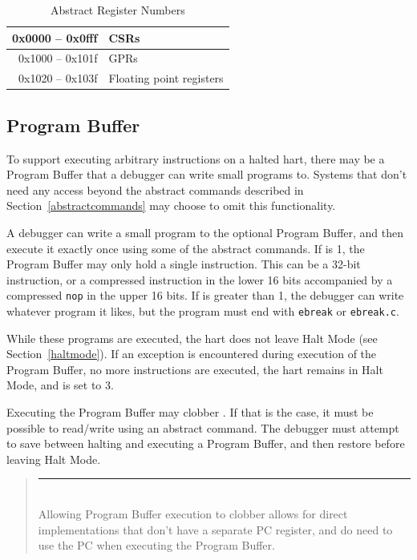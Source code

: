 \documentclass{article}
\newenvironment{commentary}
{
   \begin{quotation}
   \noindent
   \small \em
   \rule{\linewidth}{1pt}\\
}
{
   \end{quotation}
}
\begin{document}
\begin{table}[htp]
    \centering
    \caption{Abstract Register Numbers}
    \label{tab:regno}
    \begin{tabulary}{\textwidth}{|r|l|}
        \hline
        0x0000 -- 0x0fff & CSRs \\
        \hline
        0x1000 -- 0x101f & GPRs \\
        \hline
        0x1020 -- 0x103f & Floating point registers \\
        \hline
    \end{tabulary}
\end{table}



\subsection{Program Buffer} \label{programbuffer}

To support executing arbitrary instructions on a halted hart, there may be a
Program Buffer that a debugger can write small programs to. Systems that don't
need any access beyond the abstract commands described in
Section~\ref{abstractcommands} may choose to omit this functionality.

A debugger can write a small program to the optional Program Buffer, and then
execute it exactly once using some of the abstract commands. If \Fprogsize is
1, the Program Buffer may only hold a single instruction. This can be a 32-bit
instruction, or a compressed instruction in the lower 16 bits accompanied by a
compressed {\tt nop} in the upper 16 bits.  If \Fprogsize is greater than 1,
the debugger can write whatever program it likes, but the program must end with
{\tt ebreak} or {\tt ebreak.c}.

While these programs are executed, the hart does not leave Halt Mode (see
Section~\ref{haltmode}).  If an exception is encountered during execution of
the Program Buffer, no more instructions are executed, the hart remains in Halt
Mode, and \Fcmderr is set to 3.

Executing the Program Buffer may clobber \Rdpc. If that is the case, it must be
possible to read/write \Rdpc using an abstract command. The debugger must
attempt to save \Rdpc between halting and executing a Program Buffer, and then
restore \Rdpc before leaving Halt Mode.

\begin{commentary}
    Allowing Program Buffer execution to clobber \Rdpc allows for direct
    implementations that don't have a separate PC register, and do need to use
    the PC when executing the Program Buffer.
\end{commentary}
\end{document}
